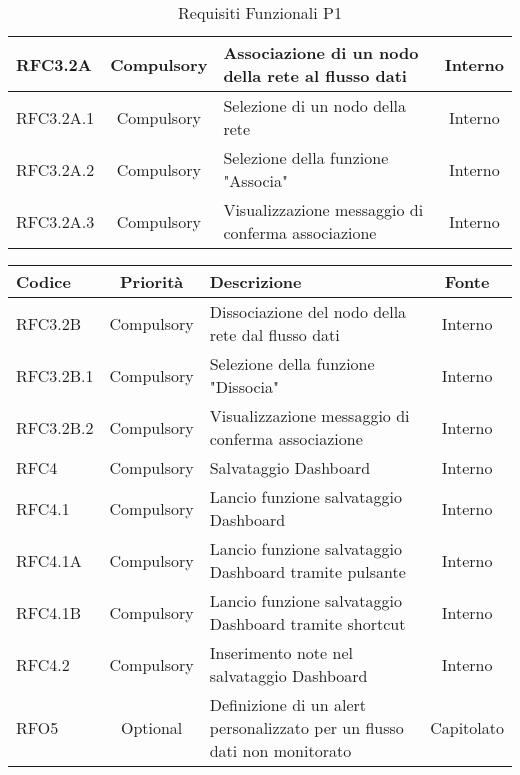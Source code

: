 \begin{table}[!htpb]
\begin{tabular}{|l|c|p{9cm}|c|}
                \hline
                RFC3.2A & Compulsory & Associazione di un nodo della rete al flusso dati & Interno\\
                \hline
                RFC3.2A.1 & Compulsory & Selezione di un nodo della rete & Interno\\
                \hline
                RFC3.2A.2 & Compulsory & Selezione della funzione "Associa" & Interno\\
                \hline
                RFC3.2A.3 & Compulsory & Visualizzazione messaggio di conferma associazione & Interno\\
                \hline
			\end{tabular}
			\caption{Requisiti Funzionali P1}
		\end{table}
        \begin{table}[!htpb]
            \centering
            \renewcommand{\arraystretch}{1.5} %
            \begin{tabular}{|l|c|p{9cm}|c|}
                \rowcolor{orange!50}
        		\hline
        		\textbf{Codice} & \textbf{Priorità} & \textbf{Descrizione} & \textbf{Fonte}\\
                \hline
                RFC3.2B & Compulsory & Dissociazione del nodo della rete dal flusso dati & Interno\\
                \hline
                RFC3.2B.1 & Compulsory & Selezione della funzione "Dissocia" & Interno\\
                \hline
                RFC3.2B.2 & Compulsory & Visualizzazione messaggio di conferma associazione & Interno\\
                \hline
                RFC4 & Compulsory & Salvataggio Dashboard & Interno\\
                \hline
                RFC4.1 & Compulsory & Lancio funzione salvataggio Dashboard & Interno\\
                \hline
                RFC4.1A & Compulsory & Lancio funzione salvataggio Dashboard tramite pulsante & Interno\\
                \hline
                RFC4.1B & Compulsory & Lancio funzione salvataggio Dashboard tramite shortcut & Interno\\
                \hline
                RFC4.2 & Compulsory & Inserimento note nel salvataggio Dashboard & Interno\\
                \hline
                RFO5 & Optional & Definizione di un alert personalizzato per un flusso dati non monitorato & Capitolato\\

\end{tabular}
\end{table}
